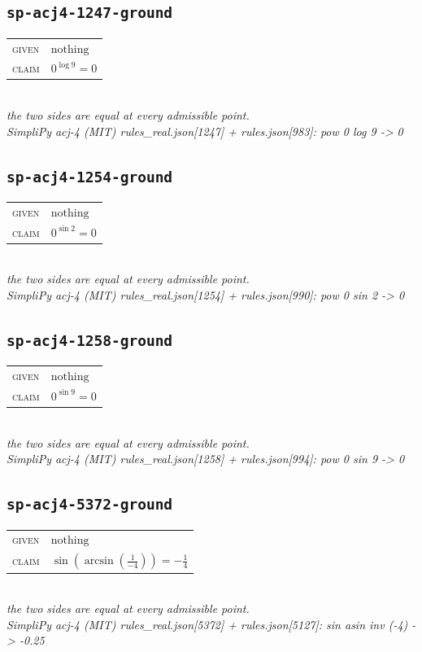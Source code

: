 \documentclass[11pt]{article}
\begin{document}
\subsection*{\texttt{sp-acj4-1247-ground}}
\begin{tabular}{@{}l@{\quad}l@{}}
\textsc{given} & $\text{nothing}$ \\[4pt]
\textsc{claim} & $\displaystyle 0^{\log 9} = 0$ \\
\end{tabular}\\[2pt]
{\small\emph{the two sides are equal at every admissible point.}}\\
\emph{SimpliPy acj-4 (MIT) rules\_real.json[1247] + rules.json[983]: pow 0 log 9  ->  0}\\

\subsection*{\texttt{sp-acj4-1254-ground}}
\begin{tabular}{@{}l@{\quad}l@{}}
\textsc{given} & $\text{nothing}$ \\[4pt]
\textsc{claim} & $\displaystyle 0^{\sin 2} = 0$ \\
\end{tabular}\\[2pt]
{\small\emph{the two sides are equal at every admissible point.}}\\
\emph{SimpliPy acj-4 (MIT) rules\_real.json[1254] + rules.json[990]: pow 0 sin 2  ->  0}\\

\subsection*{\texttt{sp-acj4-1258-ground}}
\begin{tabular}{@{}l@{\quad}l@{}}
\textsc{given} & $\text{nothing}$ \\[4pt]
\textsc{claim} & $\displaystyle 0^{\sin 9} = 0$ \\
\end{tabular}\\[2pt]
{\small\emph{the two sides are equal at every admissible point.}}\\
\emph{SimpliPy acj-4 (MIT) rules\_real.json[1258] + rules.json[994]: pow 0 sin 9  ->  0}\\

\subsection*{\texttt{sp-acj4-5372-ground}}
\begin{tabular}{@{}l@{\quad}l@{}}
\textsc{given} & $\text{nothing}$ \\[4pt]
\textsc{claim} & $\displaystyle \sin\left(\arcsin\left(\frac{1}{-4}\right)\right) = -\frac{1}{4}$ \\
\end{tabular}\\[2pt]
{\small\emph{the two sides are equal at every admissible point.}}\\
\emph{SimpliPy acj-4 (MIT) rules\_real.json[5372] + rules.json[5127]: sin asin inv (-4)  ->  -0.25}\\
\end{document}
